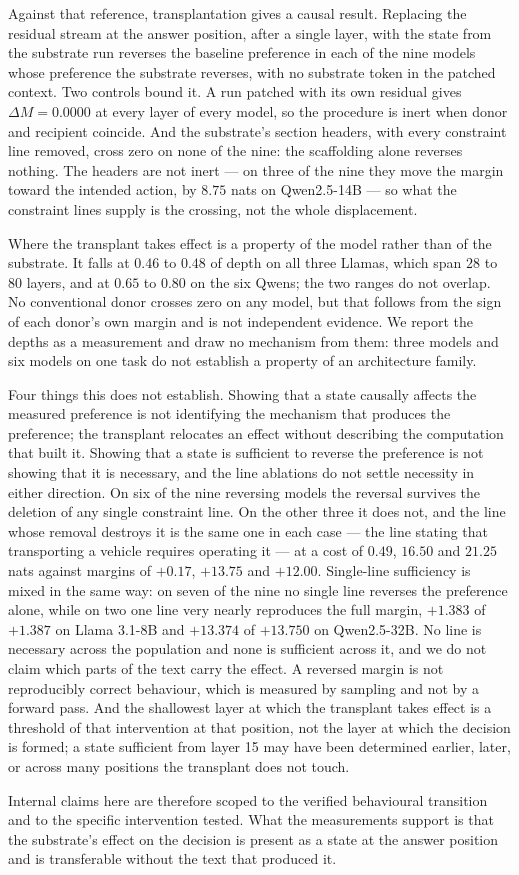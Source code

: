 Against that reference, transplantation gives a causal result. Replacing the
residual stream at the answer position, after a single layer, with the state from the
substrate run reverses the baseline preference in each of the nine models whose
preference the substrate reverses, with no substrate token in the patched context.
Two controls bound it. A run patched with its own residual gives $\Delta M = 0.0000$
at every layer of every model, so the procedure is inert when donor and recipient
coincide. And the substrate's section headers, with every constraint line removed,
cross zero on none of the nine: the scaffolding alone reverses nothing. The headers are not
inert --- on three of the nine they move the margin toward the intended action, by
$8.75$ nats on Qwen2.5-14B --- so what the constraint lines supply is the crossing,
not the whole displacement.

Where the transplant takes effect is a property of the model rather than of the
substrate. It falls at $0.46$ to $0.48$ of depth on all three Llamas, which span $28$
to $80$ layers, and at $0.65$ to $0.80$ on the six Qwens; the two ranges do not
overlap. No conventional donor crosses zero on any model, but that follows from the
sign of each donor's own margin and is not independent evidence. We report the
depths as a measurement and draw no mechanism from them: three models and six models
on one task do not establish a property of an architecture family.

Four things this does not establish. Showing that a state causally affects the
measured preference is not identifying the mechanism that produces the preference;
the transplant relocates an effect without describing the computation that built
it. Showing that a state is sufficient to reverse the preference is not showing that
it is necessary, and the line ablations do not settle necessity in either direction.
On six of the nine reversing models the reversal survives the deletion of any single
constraint line. On the other three it does not, and the line whose removal destroys
it is the same one in each case --- the line stating that transporting a vehicle
requires operating it --- at a cost of $0.49$, $16.50$ and $21.25$ nats against
margins of $+0.17$, $+13.75$ and $+12.00$. Single-line sufficiency is mixed in the
same way: on seven of the nine no single line reverses the preference alone, while on
two one line very nearly reproduces the full margin, $+1.383$ of $+1.387$ on
Llama 3.1-8B and $+13.374$ of $+13.750$ on Qwen2.5-32B. No line is necessary across
the population and none is sufficient across it, and we do not claim which parts of
the text carry the effect. A reversed
margin is not reproducibly correct behaviour, which is measured by sampling and not
by a forward pass. And the shallowest layer at which the transplant takes effect is
a threshold of that intervention at that position, not the layer at which the
decision is formed; a state sufficient from layer 15 may have been determined
earlier, later, or across many positions the transplant does not touch.

Internal claims here are therefore scoped to the verified behavioural transition and
to the specific intervention tested. What the measurements support is that the
substrate's effect on the decision is present as a state at the answer position and
is transferable without the text that produced it.
